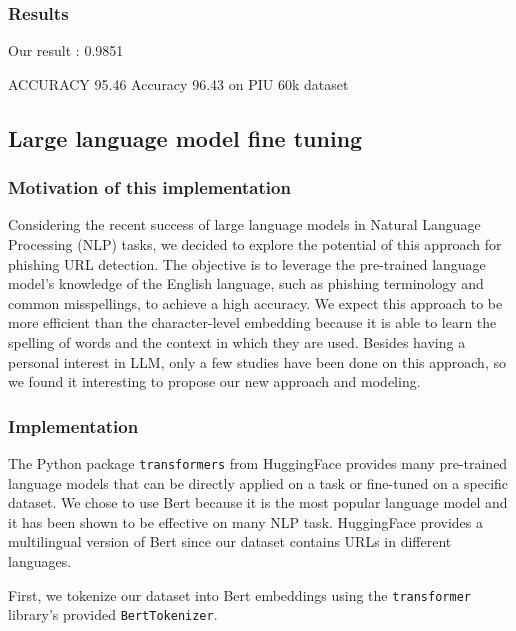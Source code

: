 \documentclass{article}
\begin{document}
    \subsubsection{Results}


    Our result : 0.9851

    \cite{CharacterLevelCNN} ACCURACY 95.46
    \cite{PhishingLoginURLDetection} Accuracy 96.43 on PIU 60k dataset

    \subsection{Large language model fine tuning}\label{subsec:large-language-model-finetuning}

    \subsubsection{Motivation of this implementation}

    Considering the recent success of large language models in Natural Language Processing (NLP) tasks, we decided to explore the potential of this approach for phishing URL detection. The objective is to leverage the pre-trained language model's knowledge of the English language, such as phishing terminology and common misspellings, to achieve a high accuracy. We expect this approach to be more efficient than the character-level embedding because it is able to learn the spelling of words and the context in which they are used. Besides having a personal interest in LLM, only a few studies have been done on this approach, so we found it interesting to propose our new approach and modeling.

    \subsubsection{Implementation}

    The Python package \texttt{transformers} from HuggingFace provides many pre-trained language models that can be directly applied on a task or fine-tuned on a specific dataset. We chose to use Bert because it is the most popular language model and it has been shown to be effective on many NLP task. HuggingFace provides a multilingual version of Bert since our dataset contains URLs in different languages.

    First, we tokenize our dataset into Bert embeddings using the \texttt{transformer} library's provided \texttt{BertTokenizer}.
\end{document}
